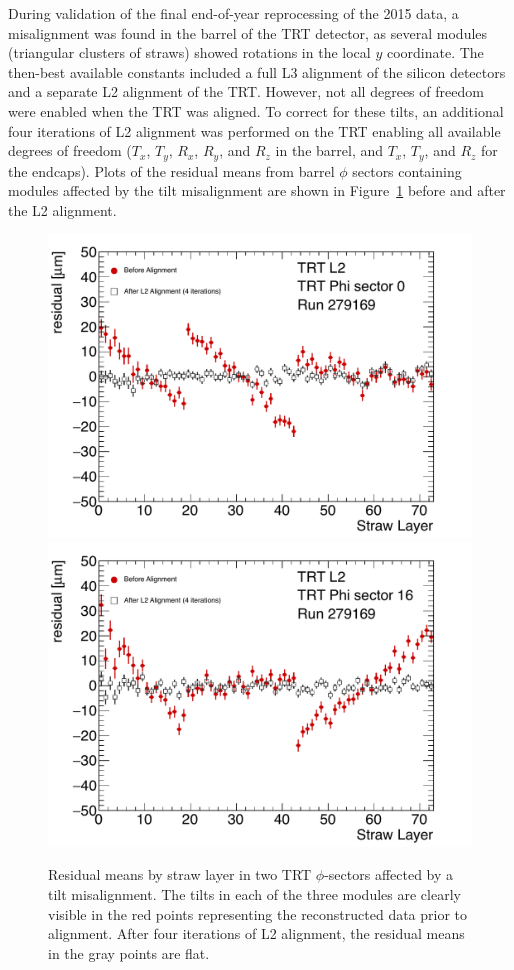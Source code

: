 During validation of the final end-of-year reprocessing of the 2015 data, a misalignment was found in the barrel of the TRT detector, as several modules (triangular clusters of straws) showed rotations in the local $y$ coordinate.
The then-best available constants included a full L3 alignment of the silicon detectors and a separate L2 alignment of the TRT.
However, not all degrees of freedom were enabled when the TRT was aligned.
To correct for these tilts, an additional four iterations of L2 alignment was performed on the TRT enabling all available degrees of freedom ($T_x$, $T_y$, $R_x$, $R_y$, and $R_z$ in the barrel, and $T_x$, $T_y$, and $R_z$ for the endcaps).
Plots of the residual means from barrel $\phi$ sectors containing modules affected by the tilt misalignment are shown in Figure~\ref{fig:align_trt_l2} before and after the L2 alignment.

\begin{figure}[htbp]
  \centering
  \includegraphics[width=.48\textwidth]{figs/alignment/trt/TRT_aveResVsStrawLayerModule0}
  \includegraphics[width=.48\textwidth]{figs/alignment/trt/TRT_aveResVsStrawLayerModule16}
  \caption{Residual means by straw layer in two TRT $\phi$-sectors affected by a tilt misalignment.  The tilts in each of the three modules are clearly visible in the red points representing the reconstructed data prior to alignment.  After four iterations of L2 alignment, the residual means in the gray points are flat.}
  \label{fig:align_trt_l2}
\end{figure}

